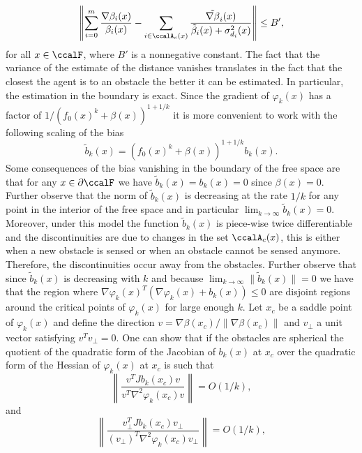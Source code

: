 \documentclass[article]{IEEEtran}
\theoremstyle{definition}
\begin{document}
%
\begin{equation}\label{eqn_bounded_difference}
\left\|\sum_{i=0}^m\frac{\nabla \beta_i(x)}{\beta_i(x)}-\sum_{i\in\ccalA_c(x)}\frac{\tilde{\nabla \beta}_i(x)}{\tilde{\beta}_i(x)+\sigma_{d_i}^2(x)}\right\| \leq B',
\end{equation}
%
for all $x\in\ccalF$, where $B'$ is a nonnegative constant. The fact that the variance of the estimate of the distance vanishes translates in the fact that the closest the agent is to an obstacle the better it can be estimated. In particular, the estimation in the boundary is exact. Since the gradient of $\varphi_k(x)$ has a factor of $1/\left(f_0(x)^k+\beta(x)\right)^{1+1/k}$ it is more convenient to work with the following scaling of the bias 
%
\begin{equation}
\tilde{b}_k(x) = \left(f_0(x)^k+\beta(x)\right)^{1+1/k}b_k(x).
\end{equation}
%
Some consequences of the bias vanishing in the boundary of the free space are that for any $x\in \partial \ccalF$ we have $\tilde{b}_k(x) =b_k(x)= 0$ since $\beta(x) =0$. Further observe that the norm of $\tilde{b}_k(x)$ is decreasing at the rate $1/k$ for any point in the interior of the free space and in particular $\lim_{k\to \infty} \tilde{b}_k(x)=0$. Moreover, under this model the function $\tilde{b}_k(x)$ is piece-wise twice differentiable and the discontinuities are due to changes in the set $\ccalA_c(x)$, this is either when a new obstacle is sensed or when an obstacle cannot be sensed anymore. Therefore, the discontinuities occur away from the obstacles.
Further observe that since $\tilde{b}_k(x)$ is decreasing with $k$ and because $\lim_{k\to\infty}\|\tilde{b}_k(x)\|=0$ we have that the region where $\nabla \varphi_k(x)^T\left(\nabla \varphi_k(x)+b_k(x)\right)\leq 0$ are disjoint regions around the critical points of $\varphi_k(x)$ for large enough $k$. Let $x_c$ be a saddle point of $\varphi_k(x)$ and define the direction $v = \nabla \beta(x_c) / \|\nabla \beta(x_c)\|$ and $v_\perp$ a unit vector satisfying $v^T v_\perp=0$. One can show that if the obstacles are spherical the quotient of the quadratic form of the Jacobian of $b_k(x)$ at $x_c$ over the quadratic form of the Hessian of $\varphi_k(x)$ at $x_c$ is such that
%
\begin{equation}\label{eqn_quotient_jacobians1}
\left\|\frac{v^T Jb_k(x_c)v}{v^T\nabla^2\varphi_k(x_c)v}\right\| = O(1/k),
\end{equation}
%
and
\begin{equation}\label{eqn_quotient_jacobians2}
\left\|\frac{v_\perp^T Jb_k(x_c)v_{\perp}}{(v_\perp)^T\nabla^2\varphi_k(x_c)v_\perp}\right\| = O(1/k),
\end{equation}
\end{document}
